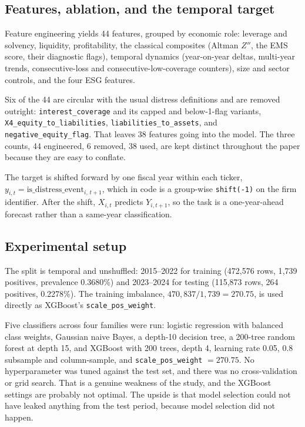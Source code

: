 \documentclass[conference]{IEEEtran}
\newcommand{\code}[1]{\texttt{\small #1}}
\begin{document}
\subsection{Features, ablation, and the temporal target}
Feature engineering yields 44 features, grouped by economic role: leverage and
solvency, liquidity, profitability, the classical composites (Altman $Z''$, the
EMS score, their diagnostic flags), temporal dynamics (year-on-year deltas,
multi-year trends, consecutive-loss and consecutive-low-coverage counters), size
and sector controls, and the four ESG features.

Six of the 44 are circular with the usual distress definitions and are removed
outright: \code{interest\_coverage} and its capped and below-1-flag variants,
\code{X4\_equity\_to\_liabilities}, \code{liabilities\_to\_assets}, and
\code{negative\_equity\_flag}. That leaves 38 features going into the model. The
three counts, 44 engineered, 6 removed, 38 used, are kept distinct throughout the
paper because they are easy to conflate.

The target is shifted forward by one fiscal year within each ticker,
$y_{i,t} = \mathrm{is\_distress\_event}_{i,\,t+1}$, which in code is a group-wise
\code{shift(-1)} on the firm identifier. After the shift, $X_{i,t}$ predicts
$Y_{i,t+1}$, so the task is a one-year-ahead forecast rather than a
same-year classification.

\subsection{Experimental setup}
The split is temporal and unshuffled: 2015--2022 for training (472{,}576 rows,
1{,}739 positives, prevalence 0.3680\%) and 2023--2024 for testing (115{,}873
rows, 264 positives, 0.2278\%). The training imbalance,
$470{,}837 / 1{,}739 = 270.75$, is used directly as XGBoost's
\code{scale\_pos\_weight}.

Five classifiers across four families were run: logistic regression with balanced
class weights, Gaussian naive Bayes, a depth-10 decision tree, a 200-tree random
forest at depth 15, and XGBoost with 200 trees, depth 4, learning rate 0.05,
0.8 subsample and column-sample, and \code{scale\_pos\_weight} $= 270.75$. No
hyperparameter was tuned against the test set, and there was no cross-validation
or grid search. That is a genuine weakness of the study, and the XGBoost
settings are probably not optimal. The upside is that model selection could not
have leaked anything from the test period, because model selection did not
happen.
\end{document}
